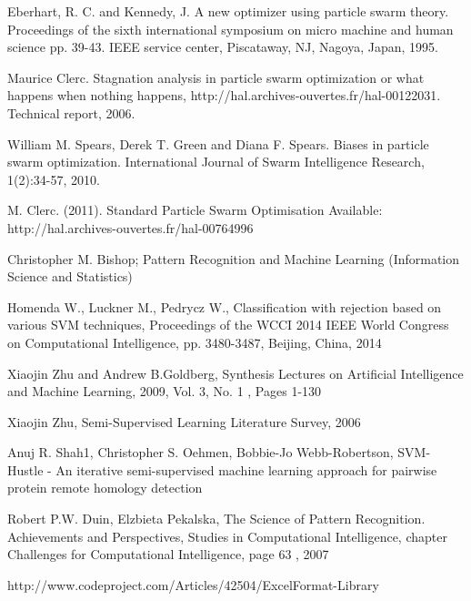 \documentclass{mini}
\begin{document}
\begin{thebibliography}{1}
    
    Eberhart, R. C. and Kennedy, J. A new optimizer using particle swarm theory. Proceedings of the sixth international symposium on micro machine and human science pp. 39-43. IEEE service center, Piscataway, NJ, Nagoya, Japan, 1995.
    
    Maurice Clerc. Stagnation analysis in particle swarm optimization or what happens when nothing happens, http://hal.archives-ouvertes.fr/hal-00122031. Technical report, 2006.

    William M. Spears, Derek T. Green and Diana F. Spears. Biases in particle swarm optimization. International Journal of Swarm Intelligence Research, 1(2):34-57, 2010.

    M. Clerc. (2011). Standard Particle Swarm Optimisation Available: http://hal.archives-ouvertes.fr/hal-00764996 
    
     Christopher M. Bishop; Pattern Recognition and Machine Learning (Information Science and Statistics)
    
	 Homenda W., Luckner M., Pedrycz W., Classification with rejection based on various SVM techniques, Proceedings of the WCCI 2014 IEEE World Congress on Computational Intelligence, pp. 3480-3487, Beijing, China, 2014     
    
	 Xiaojin Zhu and Andrew B.Goldberg, Synthesis Lectures on Artificial Intelligence and Machine Learning, 2009, Vol. 3, No. 1 , Pages 1-130    
	
     Xiaojin Zhu, Semi-Supervised Learning Literature Survey, 2006

	
	 Anuj R. Shah1, Christopher S. Oehmen, Bobbie-Jo Webb-Robertson, SVM-Hustle - An iterative semi-supervised machine learning approach for pairwise protein remote homology detection 
    
	 Robert P.W. Duin, Elzbieta Pekalska, The Science of Pattern Recognition. Achievements and Perspectives, Studies in Computational Intelligence, chapter Challenges for Computational Intelligence, page 63 , 2007
    
     http://www.codeproject.com/Articles/42504/ExcelFormat-Library
	

\end{thebibliography}
\end{document}
